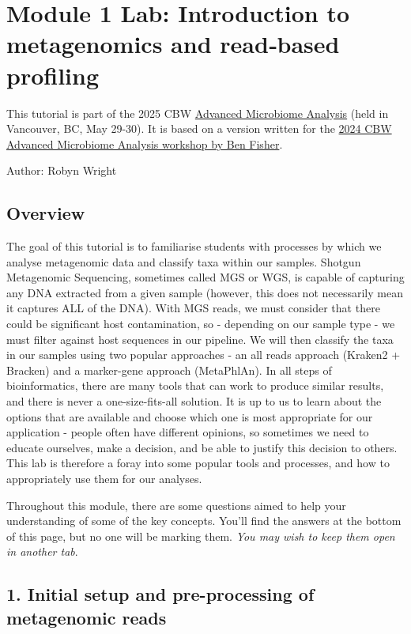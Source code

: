\documentclass[
]{book}
\begin{document}
\chapter{Module 1 Lab: Introduction to metagenomics and read‐based profiling}\label{module-1-lab-introduction-to-metagenomics-and-readbased-profiling}

This tutorial is part of the 2025 CBW \href{https://bioinformaticsdotca.github.io/AMB_2025/}{Advanced Microbiome Analysis} (held in Vancouver, BC, May 29-30). It is based on a version written for the \href{https://bioinformaticsdotca.github.io/AMB_2024_module1}{2024 CBW Advanced Microbiome Analysis workshop by Ben Fisher}.

Author: Robyn Wright

\section{Overview}\label{overview}

The goal of this tutorial is to familiarise students with processes by which we analyse metagenomic data and classify taxa within our samples. Shotgun Metagenomic Sequencing, sometimes called MGS or WGS, is capable of capturing any DNA extracted from a given sample (however, this does not necessarily mean it captures ALL of the DNA). With MGS reads, we must consider that there could be significant host contamination, so - depending on our sample type - we must filter against host sequences in our pipeline. We will then classify the taxa in our samples using two popular approaches - an all reads approach (Kraken2 + Bracken) and a marker-gene approach (MetaPhlAn). In all steps of bioinformatics, there are many tools that can work to produce similar results, and there is never a one-size-fits-all solution. It is up to us to learn about the options that are available and choose which one is most appropriate for our application - people often have different opinions, so sometimes we need to educate ourselves, make a decision, and be able to justify this decision to others. This lab is therefore a foray into some popular tools and processes, and how to appropriately use them for our analyses.

Throughout this module, there are some questions aimed to help your understanding of some of the key concepts. You'll find the answers at the bottom of this page, but no one will be marking them. \emph{You may wish to keep them open in another tab}.

\section{1. Initial setup and pre-processing of metagenomic reads}\label{initial-setup-and-pre-processing-of-metagenomic-reads}
\end{document}
